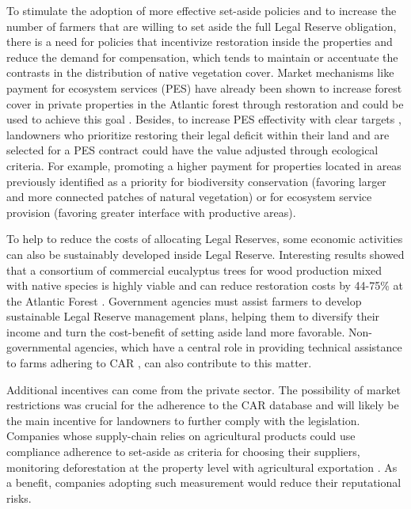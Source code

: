 \documentclass[
	12pt,				%
	oneside,			%
	a4paper,			%
	chapter=TITLE,		%
	section=TITLE,		%
	brazil,			%
	english				%
	]{abntex2}
\begin{document}
To stimulate the adoption of more effective set-aside policies and to increase the number of farmers that are willing to set aside the full Legal Reserve obligation, there is a need for policies that incentivize restoration inside the properties and reduce the demand for compensation, which tends to maintain or accentuate the contrasts in the distribution of native vegetation cover. Market mechanisms like payment for ecosystem services (PES) have already been shown to increase forest cover in private properties in the Atlantic forest through restoration \autocite{ruggiero_payment_2019} and could be used to achieve this goal \autocite{brancalion_critical_2016}. Besides, to increase PES effectivity with clear targets \autocite{wunder_payments_2020}, landowners who prioritize restoring their legal deficit within their land and are selected for a PES contract could have the value adjusted through ecological criteria. For example, promoting a higher payment for properties located in areas previously identified as a priority for biodiversity conservation (favoring larger and more connected patches of natural vegetation) or for ecosystem service provision (favoring greater interface with productive areas).

To help to reduce the costs of allocating Legal Reserves, some economic activities can also be sustainably developed inside Legal Reserve. Interesting results showed that a consortium of commercial eucalyptus trees for wood production mixed with native species is highly viable \autocite{amazonas_high_2018} and can reduce restoration costs by 44-75\% at the Atlantic Forest \autocite{brancalion_exotic_2020}. Government agencies must assist farmers to develop sustainable Legal Reserve management plans, helping them to diversify their income and turn the cost-benefit of setting aside land more favorable. Non-governmental agencies, which have a central role in providing technical assistance to farms adhering to CAR \autocite{jung_brazils_2017}, can also contribute to this matter.

Additional incentives can come from the private sector. The possibility of market restrictions was crucial for the adherence to the CAR database \autocite{azevedo_limits_2017} and will likely be the main incentive for landowners to further comply with the legislation. Companies whose supply-chain relies on agricultural products could use compliance adherence to set-aside as criteria for choosing their suppliers, monitoring deforestation at the property level with agricultural exportation \autocite{rajao_rotten_2020}. As a benefit, companies adopting such measurement would reduce their reputational risks.
\end{document}
